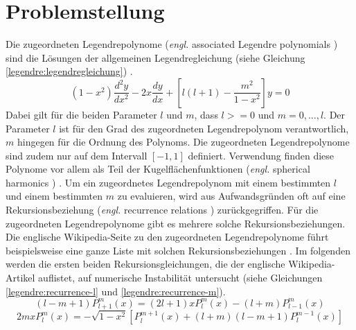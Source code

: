 %
%
%
\section{Problemstellung
\label{legendre:section:problemstellung}}
Die zugeordneten Legendrepolynome (\textit{engl.} associated Legendre polynomials ) sind die Lösungen der allgemeinen Legendregleichung (siehe Gleichung \eqref{legendre:legendregleichung}) \cite{legendre:assoc-legendre-poly-wolfram} \cite{legendre:assoc-legendre-diff-wolfram}.
\begin{equation}
(1-x^2) \frac{d^2y}{dx^2}
-2x \frac{dy}{dx}
+ \left[ l(l+1)- \frac{m^2}{1-x^2} \right] y
=0
\label{legendre:legendregleichung}
\end{equation}
Dabei gilt für die beiden Parameter $l$ und $m$, dass $l>=0$ und $m=0, \ldots , l$.
Der Parameter $l$ ist für den Grad des zugeordneten Legendrepolynom verantwortlich, $m$ hingegen für die Ordnung des Polynoms.
Die zugeordneten Legendrepolynome sind zudem nur auf dem Intervall $[-1, 1]$ definiert.
Verwendung finden diese Polynome vor allem als Teil der Kugelflächenfunktionen (\textit{engl.} spherical harmonics ) \cite{legendre:spherical-harmonic-wolfram}.
Um ein zugeordnetes Legendrepolynom mit einem bestimmten $l$ und einem bestimmten $m$ zu evaluieren, wird aus Aufwandsgründen oft auf eine Rekursionsbeziehung (\textit{engl.} recurrence relations ) zurückgegriffen.
Für die zugeordneten Legendrepolynome gibt es mehrere solche Rekursionsbeziehungen.
Die englische Wikipedia-Seite zu den zugeordneten Legendrepolynome führt beispielsweise eine ganze Liste mit solchen Rekursionsbeziehungen \cite{legendre:wikipedia}.
Im folgenden werden die ersten beiden Rekursionsgleichungen, die der englische Wikipedia-Artikel auflistet, auf numerische Instabilität untersucht (siehe Gleichungen \eqref{legendre:recurrence-l} und \eqref{legendre:recurrence-m}).
\begin{equation}
(l-m+1)P^{m}_{l+1}(x)
=(2l+1)xP^{m}_{l}(x)
-(l+m)P^{m}_{l-1}(x)
\label{legendre:recurrence-l}
\end{equation}
\begin{equation}
2mxP^{m}_{l}(x)
=-\sqrt{1-x^2}
\left[ P^{m+1}_{l}(x) + (l+m)(l-m+1)P^{m-1}_{l}(x) \right]
\label{legendre:recurrence-m}
\end{equation}